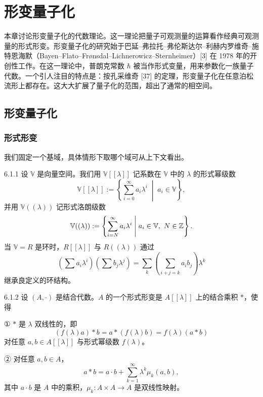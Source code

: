 
\chapter{形变量子化}

本章讨论形变量子化的代数理论。这一理论把量子可观测量的运算看作经典可观测量的形式形变。形变量子化的研究始于巴延–弗拉托–弗伦斯达尔–利赫内罗维奇–施特恩海默（Bayen–Flato–Frønsdal–Lichnerowicz–Sternheimer）[3] 在 1978 年的开创性工作。在这一理论中，普朗克常数 $\hbar$ 被当作形式变量，用来参数化一族量子代数。一个引人注目的特点是：按孔采维奇 [37] 的定理，形变量子化在任意泊松流形上都存在。这大大扩展了量子化的范围，超出了通常的相空间。

\section{形变量子化}

\subsection{形式形变}

我们固定一个基域，具体情形下取哪个域可从上下文看出。

\begin{definition}{6.1.1}
  设 $\mathbb{V}$ 是向量空间。我们用 $\mathbb{V}[[\lambda]]$ 记系数在 $\mathbb{V}$ 中的 $\lambda$ 的形式幂级数
  \[
  \mathbb{V}[[\lambda]]:=\left\{\sum_{i=0}^\infty a_i\lambda^i
  \;\middle|\; a_i\in\mathbb{V}\right\},
  \]
  并用 $\mathbb{V}((\lambda))$ 记形式洛朗级数
  \[
  \mathbb{V}((\lambda)):=\left\{\sum_{i=N}^\infty a_i\lambda^i
  \;\middle|\; a_i\in\mathbb{V},\ N\in\mathbb{Z}\right\}.
  \]
  当 $\mathbb{V}=R$ 是环时，$R[[\lambda]]$ 与 $R((\lambda))$ 通过
  \[
  \left(\sum a_i\lambda^i\right)\left(\sum b_j\lambda^j\right)
  =\sum_k\left(\sum_{i+j=k}a_ib_j\right)\lambda^k
  \]
  继承良定义的环结构。
\end{definition}

\begin{definition}{6.1.2}
  设 $(A,\cdot)$ 是结合代数。$A$ 的一个形式形变是 $A[[\lambda]]$ 上的结合乘积 $*$，使得

  ① $*$ 是 $\lambda$ 双线性的，即
  \[
  (f(\lambda)a)*b=a*(f(\lambda)b)=f(\lambda)(a*b)
  \]
  对任意 $a,b\in A[[\lambda]]$ 与形式幂级数 $f(\lambda)$。

  ② 对任意 $a,b\in A$，
  \[
  a*b=a\cdot b+\sum_{k=1}^\infty\lambda^k\mu_k(a,b),
  \]
  其中 $a\cdot b$ 是 $A$ 中的乘积，$\mu_k:A\times A\to A$ 是双线性映射。
\end{definition}


